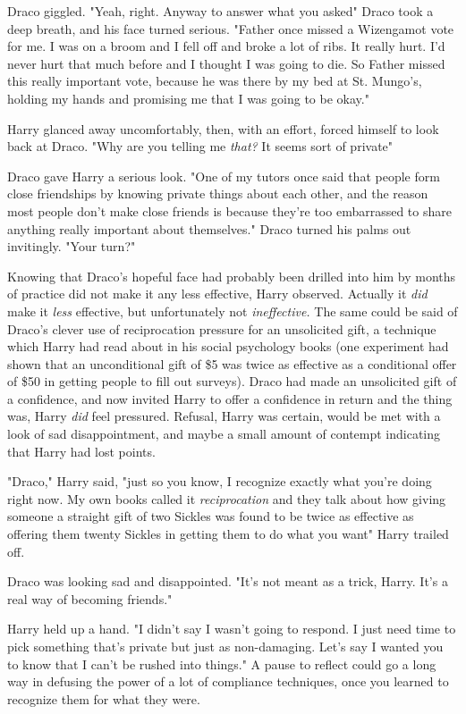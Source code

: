 Draco giggled. "Yeah, right. Anyway{\el} to answer what you asked{\el}"
Draco took a deep breath, and his face turned serious. "Father once missed a
Wizengamot vote for me. I was on a broom and I fell off and broke a lot of
ribs. It really hurt. I'd never hurt that much before and I thought I was going
to die. So Father missed this really important vote, because he was there by my
bed at St. Mungo's, holding my hands and promising me that I was going to be
okay."

Harry glanced away uncomfortably, then, with an effort, forced himself to look
back at Draco. "Why are you telling me \emph{that?} It seems sort of{\el}
private{\el}"

Draco gave Harry a serious look. "One of my tutors once said that people form
close friendships by knowing private things about each other, and the reason
most people don't make close friends is because they're too embarrassed to
share anything really important about themselves." Draco turned his palms out
invitingly. "Your turn?"

Knowing that Draco's hopeful face had probably been drilled into him by months
of practice did not make it any less effective, Harry observed. Actually it
\emph{did} make it \emph{less} effective, but unfortunately not
\emph{ineffective.} The same could be said of Draco's clever use of
reciprocation pressure for an unsolicited gift, a technique which Harry had
read about in his social psychology books (one experiment had shown that an
unconditional gift of \$5 was twice as effective as a conditional offer of \$50
in getting people to fill out surveys). Draco had made an unsolicited gift of a
confidence, and now invited Harry to offer a confidence in return{\el} and
the thing was, Harry \emph{did} feel pressured. Refusal, Harry was certain,
would be met with a look of sad disappointment, and maybe a small amount of
contempt indicating that Harry had lost points.

"Draco," Harry said, "just so you know, I recognize exactly what you're doing
right now. My own books called it \emph{reciprocation} and they talk about how
giving someone a straight gift of two Sickles was found to be twice as
effective as offering them twenty Sickles in getting them to do what you
want{\el}" Harry trailed off.

Draco was looking sad and disappointed. "It's not meant as a trick, Harry. It's
a real way of becoming friends."

Harry held up a hand. "I didn't say I wasn't going to respond. I just need time
to pick something that's private but just as non-damaging. Let's say{\el} I
wanted you to know that I can't be rushed into things." A pause to reflect
could go a long way in defusing the power of a lot of compliance techniques,
once you learned to recognize them for what they were.

